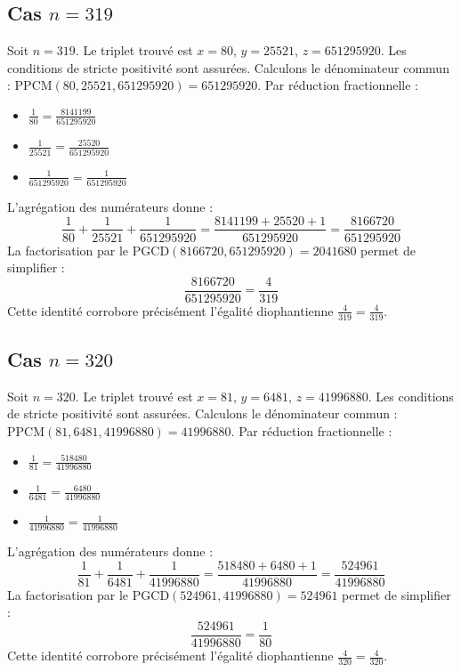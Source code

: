 \documentclass[11pt,a4paper]{article}
\begin{document}
\subsection{Cas $n = 319$}
Soit $n = 319$. Le triplet trouvé est $x = 80$, $y = 25521$, $z = 651295920$.
Les conditions de stricte positivité sont assurées.
Calculons le dénominateur commun : $\text{PPCM}(80, 25521, 651295920) = 651295920$.
Par réduction fractionnelle :
\begin{itemize}
    \item $\frac{1}{80} = \frac{8141199}{651295920}$
    \item $\frac{1}{25521} = \frac{25520}{651295920}$
    \item $\frac{1}{651295920} = \frac{1}{651295920}$
\end{itemize}
L'agrégation des numérateurs donne :
$$ \frac{1}{80} + \frac{1}{25521} + \frac{1}{651295920} = \frac{8141199 + 25520 + 1}{651295920} = \frac{8166720}{651295920} $$
La factorisation par le $\text{PGCD}(8166720, 651295920) = 2041680$ permet de simplifier :
$$ \frac{8166720}{651295920} = \frac{4}{319} $$
Cette identité corrobore précisément l'égalité diophantienne $\frac{4}{319} = \frac{4}{319}$.

\subsection{Cas $n = 320$}
Soit $n = 320$. Le triplet trouvé est $x = 81$, $y = 6481$, $z = 41996880$.
Les conditions de stricte positivité sont assurées.
Calculons le dénominateur commun : $\text{PPCM}(81, 6481, 41996880) = 41996880$.
Par réduction fractionnelle :
\begin{itemize}
    \item $\frac{1}{81} = \frac{518480}{41996880}$
    \item $\frac{1}{6481} = \frac{6480}{41996880}$
    \item $\frac{1}{41996880} = \frac{1}{41996880}$
\end{itemize}
L'agrégation des numérateurs donne :
$$ \frac{1}{81} + \frac{1}{6481} + \frac{1}{41996880} = \frac{518480 + 6480 + 1}{41996880} = \frac{524961}{41996880} $$
La factorisation par le $\text{PGCD}(524961, 41996880) = 524961$ permet de simplifier :
$$ \frac{524961}{41996880} = \frac{1}{80} $$
Cette identité corrobore précisément l'égalité diophantienne $\frac{4}{320} = \frac{4}{320}$.
\end{document}
